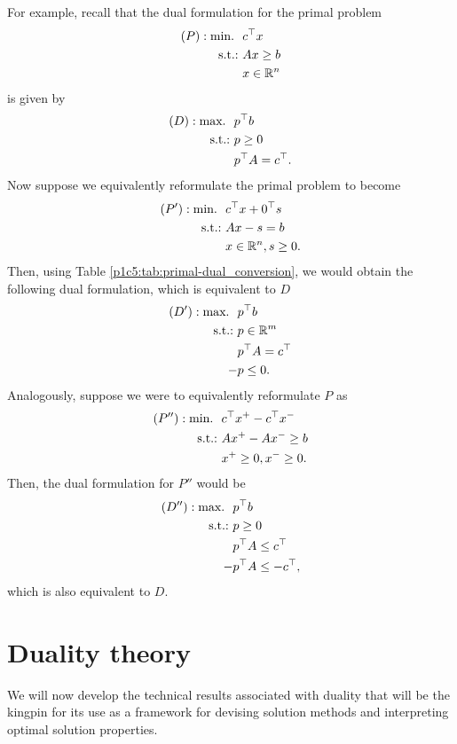 For example, recall that the dual formulation for the primal problem 
%
\begin{align*}
	(P) : \mathop{\text{min.~}} \ & c^\top x \\
	\mathop{\text{s.t.:~}} &Ax \geq b \\
	&x \in \mathbb{R}^n
\end{align*}
%
is given by
%
\begin{align*}
	(D) : \mathop{\text{max.~}} \ & p^\top b \\
	\mathop{\text{s.t.:~}} &p \geq 0 \\
	&p^\top A = c^\top. 
\end{align*}
%
Now suppose we equivalently reformulate the primal problem to become
\begin{align*}
	(P') : \mathop{\text{min.~}} \ & c^\top x + 0^\top s \\
	\mathop{\text{s.t.:~}} &A x - s = b \\
	&x \in \mathbb{R}^n, s \geq 0.
\end{align*}
%
Then, using Table \ref{p1c5:tab:primal-dual_conversion}, we would obtain the following dual formulation, which is equivalent to $D$
\begin{align*}
	(D') : \mathop{\text{max.~}} \ & p^\top b \\
	\mathop{\text{s.t.:~}} &p \in \mathbb{R}^m \\
	&p^\top A = c^\top \\
	-&p \leq 0.
\end{align*}
%
Analogously, suppose we were to equivalently reformulate $P$ as 
%
\begin{align*}
	(P'') : \mathop{\text{min.~}} \ & c^\top x^+ - c^\top x^- \\
	\mathop{\text{s.t.:~}} &Ax^+ - Ax^- \geq b \\
	&x^+ \geq 0, x^- \geq 0.
\end{align*}
%
Then, the dual formulation for $P''$ would be 
%
\begin{align*}
	(D'') : \mathop{\text{max.~}} \ & p^\top b \\
	\mathop{\text{s.t.:~}} &p \geq 0 \\
	&p^\top A \leq c^\top \\
	-&p^\top A \leq -c^\top,
\end{align*}
%
which is also equivalent to $D$.


\section{Duality theory}

We will now develop the technical results associated with duality that will be the kingpin for its use as a framework for devising solution methods and interpreting optimal solution properties. 

